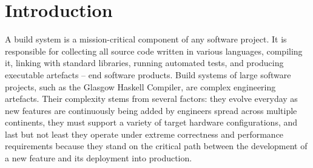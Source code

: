 \section{Introduction}

A build system is a mission-critical component of any software project.
It is responsible for collecting all source code written in various languages,
compiling it, linking with standard libraries, running automated tests, and
producing executable artefacts -- end software products. Build systems of large
software projects, such as the Glasgow Haskell Compiler, are complex engineering
artefacts. Their complexity stems from several factors: they evolve everyday as
new features are continuously being added by engineers spread across multiple
continents, they must support a variety of target hardware configurations, and
last but not least they operate under extreme correctness and performance
requirements because they stand on the critical path between the development of
a new feature and its deployment into production.
